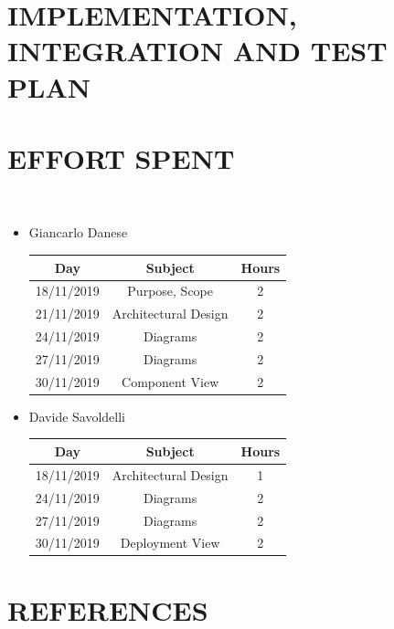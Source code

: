 \documentclass[12pt,a4paper]{article}
\begin{document}
\section{IMPLEMENTATION, INTEGRATION AND TEST PLAN}
\section{EFFORT SPENT}	\
\begin{itemize}
		\item Giancarlo Danese
		\begin{center}
			\begin{tabular}{| c | c | c |}
				\hline
				Day & Subject & Hours \\ \hline
				18/11/2019 & Purpose, Scope & 2 \\
				21/11/2019 & Architectural Design & 2\\
				24/11/2019 & Diagrams & 2\\
				27/11/2019 & Diagrams & 2\\
				30/11/2019 & Component View & 2\\
				\hline
			\end{tabular}
		\end{center}

		\item Davide Savoldelli
		\begin{center}
			\begin{tabular}{| c | c | c |}
				\hline
				Day & Subject & Hours \\ \hline
				18/11/2019 & Architectural Design & 1 \\
				24/11/2019 & Diagrams & 2 \\
				27/11/2019 & Diagrams & 2 \\
				30/11/2019 & Deployment View & 2\\
				\hline
			\end{tabular}
		\end{center}
	\end{itemize}
\section{REFERENCES}
\end{document}

